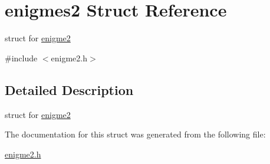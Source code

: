 \hypertarget{structenigmes2}{}\section{enigmes2 Struct Reference}
\label{structenigmes2}


struct for \hyperlink{structenigme2}{enigme2}  




{\ttfamily \#include $<$enigme2.\+h$>$}



\subsection{Detailed Description}
struct for \hyperlink{structenigme2}{enigme2} 

The documentation for this struct was generated from the following file\+:\begin{DoxyCompactItemize}
\item 
\hyperlink{enigme2_8h}{enigme2.\+h}\end{DoxyCompactItemize}

